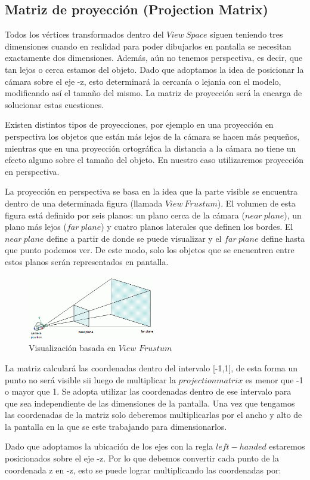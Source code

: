 \documentclass[a4paper]{article}
\begin{document}
\subsection{Matriz de proyección (Projection Matrix)}
Todos los vértices transformados dentro del $View \ Space$ siguen teniendo tres dimensiones cuando en realidad para poder dibujarlos en pantalla se necesitan exactamente dos dimensiones. Además, aún no tenemos perspectiva, es decir, que tan lejos o cerca estamos del objeto. Dado que adoptamos la idea de posicionar la cámara sobre el eje -z, esto determinará la cercanía o lejanía con el modelo, modificando así el tamaño del mismo. La matriz de proyección será la encarga de solucionar estas cuestiones.
\par Existen distintos tipos de proyecciones, por ejemplo en una proyección en perspectiva los objetos que están más lejos de la cámara se hacen más pequeños, mientras que en una proyección ortográfica la distancia a la cámara no tiene un efecto alguno sobre el tamaño del objeto. En nuestro caso utilizaremos proyección en perspectiva.
\par La proyección en perspectiva se basa en la idea que la parte visible se encuentra dentro de una determinada figura (llamada $View \ Frustum$). El volumen de esta figura está definido por seis planos: un plano cerca de la cámara ($near \ plane$), un plano más lejos ($far \ plane$) y cuatro planos laterales que definen los bordes. El $near \ plane$  define a partir de donde se puede visualizar y el $far \ plane$ define hasta que punto podemos ver. De este modo, solo los objetos que se encuentren entre estos planos serán representados en pantalla. 
 
 
\begin{figure}[h]
    \centering
    \includegraphics[width=0.50\textwidth]{Imagenes/b.png}
    \caption{Visualización basada en $View $ $Frustum$}
    \label{fig:mesh1}
\end{figure}
La matriz calculará las coordenadas dentro del intervalo [-1,1], de esta forma un punto no será visible sii luego de multiplicar la $projection matrix$ es menor que -1 o mayor que 1. Se adopta utilizar las coordenadas dentro de ese intervalo para que sea independiente de las dimensiones de la pantalla. Una vez que tengamos las coordenadas de la matriz solo deberemos multiplicarlas por el ancho y alto de la pantalla en la que se este trabajando para dimensionarlos.
\par Dado que adoptamos la ubicación de los ejes con la regla $left-handed$ estaremos posicionados sobre el eje -z. Por lo que debemos convertir cada punto de la coordenada z en -z, esto se puede lograr multiplicando las coordenadas por: 
\end{document}
